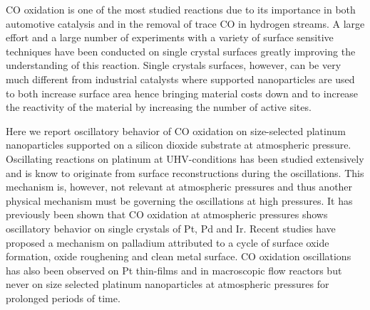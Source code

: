 \documentclass[8.5pt,twoside,twocolumn]{article}
\begin{document}



CO oxidation is one of the most studied reactions due to its importance in both automotive catalysis and in the removal of trace CO in hydrogen streams. A large effort and a large number of experiments with a variety of surface sensitive techniques have been conducted on single crystal surfaces greatly improving the understanding of this reaction. Single crystals surfaces, however, can be very much different from industrial catalysts where supported nanoparticles are used to both increase surface area hence bringing material costs down and to increase the reactivity of the material by increasing the number of active sites. 

Here we report oscillatory behavior of CO oxidation on size-selected platinum nanoparticles supported on a silicon dioxide substrate at atmospheric pressure. Oscillating reactions on platinum at UHV-conditions has been studied extensively and is know to originate from surface reconstructions during the oscillations\cite{Ertl2008}. This mechanism is, however, not relevant at atmospheric pressures and thus another physical mechanism must be governing the oscillations at high pressures. It has previously been shown\cite{SALES1982} that CO oxidation at atmospheric pressures shows oscillatory behavior on single crystals of Pt, Pd and Ir. Recent studies have proposed a mechanism on palladium \cite{Hendriksen2010} attributed to a cycle of surface oxide formation, oxide roughening and clean metal surface. CO oxidation oscillations has also been observed on Pt thin-films\cite{Lund2000} and in macroscopic flow reactors\cite{Singh2010} but never on size selected platinum nanoparticles at atmospheric pressures for prolonged periods of time.
\end{document}
